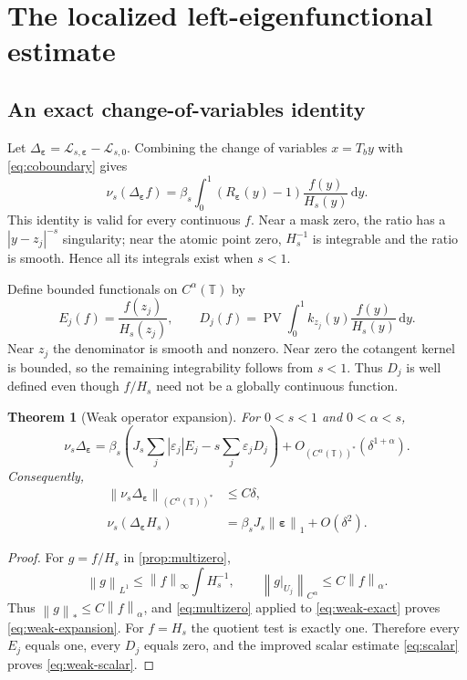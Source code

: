 \documentclass[11pt,a4paper]{article}
\numberwithin{equation}{section}
\newtheorem{theorem}{Theorem}[section]
\theoremstyle{definition}
\theoremstyle{remark}
\newcommand{\TT}{\mathbb T}
\newcommand{\dd}{\,\mathrm d}
\newcommand{\Lop}{\mathcal L}
\newcommand{\PV}{\operatorname{PV}}
\newcommand{\norm}[1]{\left\lVert#1\right\rVert}
\newcommand{\eps}{\boldsymbol\varepsilon}
\newcommand{\Holder}{C^\alpha(\TT)}
\begin{document}
\section{The localized left-eigenfunctional estimate}
\label{sec:weak}

\subsection{An exact change-of-variables identity}
Let $\Delta_{\eps}=\Lop_{s,\eps}-\Lop_{s,0}$. Combining the
change of variables $x=T_by$ with \cref{eq:coboundary} gives
\begin{equation}
 \nu_s(\Delta_{\eps} f)
 =\beta_s\int_0^1(R_{\eps}(y)-1)\frac{f(y)}{H_s(y)}\dd y.
 \label{eq:weak-exact}
\end{equation}
This identity is valid for every continuous $f$. Near a mask zero, the
ratio has a $|y-z_j|^{-s}$ singularity; near the atomic point zero,
$H_s^{-1}$ is integrable and the ratio is smooth. Hence all its
integrals exist when $s<1$.

Define bounded functionals on $\Holder$ by
\begin{equation}
 E_j(f)=\frac{f(z_j)}{H_s(z_j)},\qquad
 D_j(f)=\PV\!\int_0^1 k_{z_j}(y)\frac{f(y)}{H_s(y)}\dd y.
 \label{eq:functionals}
\end{equation}
Near $z_j$ the denominator is smooth and nonzero. Near zero the
cotangent kernel is bounded, so the remaining integrability follows
from $s<1$. Thus $D_j$ is well defined even though $f/H_s$ need not
be a globally continuous function.

\begin{theorem}[Weak operator expansion]
\label{thm:weak}
For $0<s<1$ and $0<\alpha<s$,
\begin{equation}
 \nu_s\Delta_{\eps}
 =\beta_s\left(J_s\sum_j|\varepsilon_j|E_j
                   -s\sum_j\varepsilon_jD_j\right)
       +O_{(\Holder)^*}(\delta^{1+\alpha}).
 \label{eq:weak-expansion}
\end{equation}
Consequently,
\begin{align}
 \norm{\nu_s\Delta_{\eps}}_{(\Holder)^*}&\leq C\delta,
 \label{eq:weak-bound}\\
 \nu_s(\Delta_{\eps} H_s)&=\beta_sJ_s\norm\eps_1+O(\delta^2).
 \label{eq:weak-scalar}
\end{align}
\end{theorem}
\begin{proof}
For $g=f/H_s$ in \cref{prop:multizero},
\[
 \norm g_{L^1}\leq\norm f_\infty\int H_s^{-1},\qquad
 \norm{g|_{U_j}}_{C^\alpha}\leq C\norm f_\alpha.
\]
Thus $\norm g_*\leq C\norm f_\alpha$, and \cref{eq:multizero} applied
to \cref{eq:weak-exact} proves \cref{eq:weak-expansion}.
For $f=H_s$ the quotient test is exactly one. Therefore every $E_j$
equals one, every $D_j$ equals zero, and the improved scalar estimate
\cref{eq:scalar} proves \cref{eq:weak-scalar}.
\end{proof}
\end{document}

